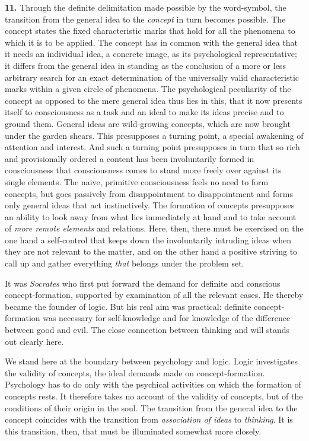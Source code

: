 \documentclass[12pt,a4paper]{book}
\newcommand{\opage}[1]{\marginnote{\footnotesize\textit{[#1]}}}
\begin{document}
\textbf{11.} Through the definite delimitation made possible by the
word-symbol, the transition from the general idea to the \emph{concept}
in turn becomes possible. The concept states the fixed characteristic
marks that hold for all the phenomena to which it is to be applied. The
concept has in common with the general idea that it needs an individual
idea, a concrete image, as its psychological representative; it differs
from the general idea in standing as the conclusion of a more or less
arbitrary
\opage{210}search for an exact determination of the universally valid
characteristic marks within a given circle of phenomena. The
psychological peculiarity of the concept as opposed to the mere general
idea thus lies in this, that it now presents itself to consciousness as
a task and an ideal to make its ideas precise and to ground them.
General ideas are wild-growing concepts, which are now brought under the
garden shears. This presupposes a turning point, a special awakening of
attention and interest. And such a turning point presupposes in turn
that so rich and provisionally ordered a content has been involuntarily
formed in consciousness that consciousness comes to stand more freely
over against its single elements. The naive, primitive consciousness
feels no need to form concepts, but goes passively from disappointment
to disappointment and forms only general ideas that act instinctively.
The formation of concepts presupposes an ability to look away from what
lies immediately at hand and to take account of \emph{more remote
elements} and relations. Here, then, there must be exercised on the one
hand a self-control that keeps down the involuntarily intruding ideas
when they are not relevant to the matter, and on the other hand a
positive striving to call up and gather everything \emph{that} belongs
under the problem set.

It was \emph{Socrates} who first put forward the demand for definite and
conscious concept-formation, supported by examination of all the
relevant cases. He thereby became the founder of logic. But his real aim
was practical: definite concept-formation was necessary for
self-knowledge and for knowledge of the difference between good and
evil. The close connection between thinking and will stands out clearly
here.

We stand here at the boundary between psychology and logic. Logic
investigates the validity of concepts, the ideal demands made on
concept-formation. Psychology has to do only with the psychical
activities on which the formation of concepts rests. It therefore takes
no account of the validity of concepts, but of the conditions of their
origin in the soul. The transition from the general idea to the concept
coincides with the transition from \emph{association of ideas} to
\emph{thinking}. It is this transition, then, that must be illuminated
somewhat more closely.
\end{document}
